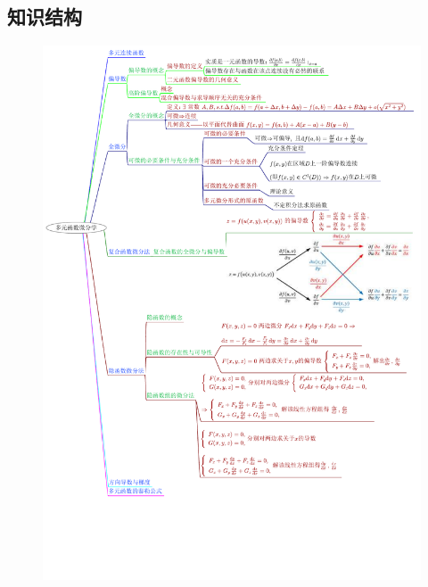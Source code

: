 \documentclass[12pt,UTF8]{ctexart}
\begin{document}
\subsection{知识结构}
\begin{figure}[H]
\begin{center}
\includegraphics[height=0.9\textheight,angle=0]{20190607.pdf}
\end{center}
\end{figure}
\end{document}
